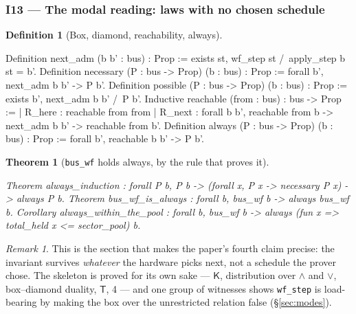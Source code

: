 \documentclass[10pt,journal,compsoc,twocolumn]{article}
\newtheorem{theorem}{Theorem}[section]
\theoremstyle{definition}
\newtheorem{definition}{Definition}[section]
\theoremstyle{remark}
\newtheorem{remark}{Remark}[section]
\theoremstyle{plain}
\newcommand{\ctr}[1]{\texttt{#1}}
\begin{document}
\subsubsection*{I13 --- The modal reading: laws with no chosen schedule}
\begin{definition}[Box, diamond, reachability, always]
\begin{coc}
Definition next_adm (b b' : bus) : Prop :=
  exists st, wf_step st /\ apply_step b st = b'.
Definition necessary (P : bus -> Prop) (b : bus) : Prop :=
  forall b', next_adm b b' -> P b'.
Definition possible (P : bus -> Prop) (b : bus) : Prop :=
  exists b', next_adm b b' /\ P b'.
Inductive reachable (from : bus) : bus -> Prop :=
  | R_here : reachable from from
  | R_next : forall b b', reachable from b -> next_adm b b' -> reachable from b'.
Definition always (P : bus -> Prop) (b : bus) : Prop :=
  forall b', reachable b b' -> P b'.
\end{coc}\end{definition}
\begin{theorem}[\ctr{bus\_wf} holds always, by the rule that proves it]
\begin{coc}
Theorem always_induction : forall P b,
  P b -> (forall x, P x -> necessary P x) -> always P b.
Theorem bus_wf_is_always : forall b, bus_wf b -> always bus_wf b.
Corollary always_within_the_pool : forall b, bus_wf b ->
  always (fun x => total_held x <= sector_pool) b.
\end{coc}\end{theorem}
\begin{remark}
This is the section that makes the paper's fourth claim precise: the invariant
survives \emph{whatever} the hardware picks next, not a schedule the prover
chose. The skeleton is proved for its own sake --- \(\mathsf{K}\), distribution
over \(\wedge\) and \(\vee\), box--diamond duality, \(\mathsf{T}\), 4 --- and one
group of witnesses shows \ctr{wf\_step} is load-bearing by making the box over
the unrestricted relation false (\S\ref{sec:modes}).
\end{remark}
\end{document}
